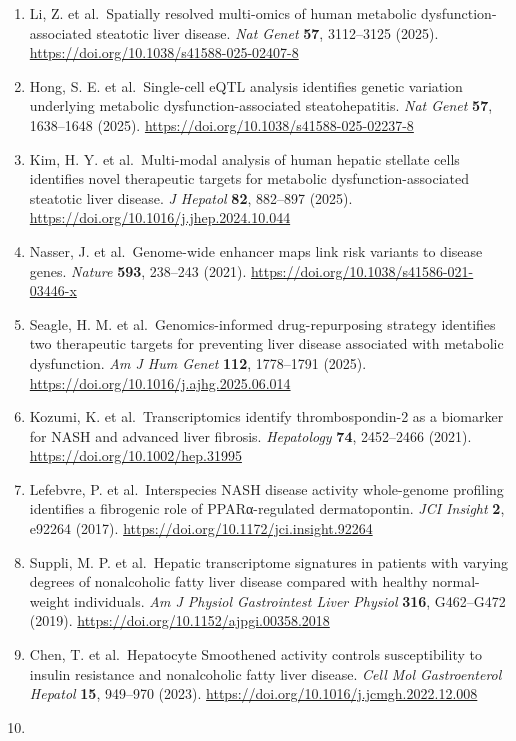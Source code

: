\begin{enumerate}
\item
  Li, Z. et al.~Spatially resolved multi-omics of human metabolic dysfunction-associated steatotic liver disease. \emph{Nat Genet} \textbf{57}, 3112--3125 (2025). \url{https://doi.org/10.1038/s41588-025-02407-8}
\item
  Hong, S. E. et al.~Single-cell eQTL analysis identifies genetic variation underlying metabolic dysfunction-associated steatohepatitis. \emph{Nat Genet} \textbf{57}, 1638--1648 (2025). \url{https://doi.org/10.1038/s41588-025-02237-8}
\item
  Kim, H. Y. et al.~Multi-modal analysis of human hepatic stellate cells identifies novel therapeutic targets for metabolic dysfunction-associated steatotic liver disease. \emph{J Hepatol} \textbf{82}, 882--897 (2025). \url{https://doi.org/10.1016/j.jhep.2024.10.044}
\item
  Nasser, J. et al.~Genome-wide enhancer maps link risk variants to disease genes. \emph{Nature} \textbf{593}, 238--243 (2021). \url{https://doi.org/10.1038/s41586-021-03446-x}
\item
  Seagle, H. M. et al.~Genomics-informed drug-repurposing strategy identifies two therapeutic targets for preventing liver disease associated with metabolic dysfunction. \emph{Am J Hum Genet} \textbf{112}, 1778--1791 (2025). \url{https://doi.org/10.1016/j.ajhg.2025.06.014}
\item
  Kozumi, K. et al.~Transcriptomics identify thrombospondin-2 as a biomarker for NASH and advanced liver fibrosis. \emph{Hepatology} \textbf{74}, 2452--2466 (2021). \url{https://doi.org/10.1002/hep.31995}
\item
  Lefebvre, P. et al.~Interspecies NASH disease activity whole-genome profiling identifies a fibrogenic role of PPARα-regulated dermatopontin. \emph{JCI Insight} \textbf{2}, e92264 (2017). \url{https://doi.org/10.1172/jci.insight.92264}
\item
  Suppli, M. P. et al.~Hepatic transcriptome signatures in patients with varying degrees of nonalcoholic fatty liver disease compared with healthy normal-weight individuals. \emph{Am J Physiol Gastrointest Liver Physiol} \textbf{316}, G462--G472 (2019). \url{https://doi.org/10.1152/ajpgi.00358.2018}
\item
  Chen, T. et al.~Hepatocyte Smoothened activity controls susceptibility to insulin resistance and nonalcoholic fatty liver disease. \emph{Cell Mol Gastroenterol Hepatol} \textbf{15}, 949--970 (2023). \url{https://doi.org/10.1016/j.jcmgh.2022.12.008}
\item

\end{enumerate}
